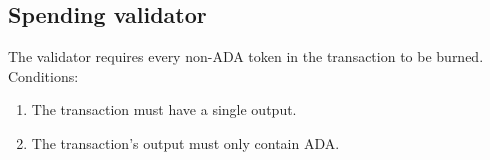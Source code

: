 \documentclass[../midgard.tex]{subfiles}
\begin{document}
\subsection{Spending validator}
\label{h:hub-oracle-spending-validator}

The  validator requires every non-ADA token in the transaction to be burned. Conditions:
\begin{enumerate}
    \item The transaction must have a single output.
    \item The transaction's output must only contain ADA.
\end{enumerate}
\end{document}
